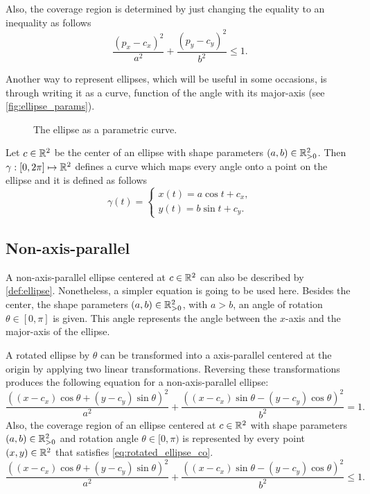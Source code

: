 Also, the coverage region is determined by just changing the equality to an inequality as follows
\begin{equation}\label{equation:cover_pellipse}
\frac{(p_x-c_x)^2}{a^2} + \frac{(p_y-c_y)^2}{b^2} \le 1.
\end{equation}

Another way to represent ellipses, which will be useful in some occasions, is through writing it as a curve, function of the angle with its major-axis (see \autoref{fig:ellipse_params}).

\begin{figure}[H]
    \centering
    
    \caption{The ellipse as a parametric curve.}
    
    \fautor
    \label{fig:ellipse_params}
\end{figure}

Let $c \in \mathbb{R}^2$ be the center of an ellipse with shape parameters $(a,b) \in \mathbb{R}^2_{>0}$. Then $\gamma : [0, 2\pi] \mapsto \mathbb{R}^2$ defines a curve which maps every angle onto a point on the ellipse and it is defined as follows
\begin{equation}\label{eq:parametric_ellipse}
\gamma(t) = \left\{
\begin{array}{l}
x(t)= a\cos{t} + c_x,\\
y(t)=b\sin{t} + c_y.
\end{array}
\right.
\end{equation}

\subsection{Non-axis-parallel}

A non-axis-parallel ellipse centered at $c\in\mathbb{R}^2$ can also be described by \autoref{def:ellipse}. Nonetheless, a simpler equation is going to be used here. Besides the center, the shape parameters $(a, b) \in \mathbb{R}^2_{>0}$, with $a > b$, an angle of rotation $\theta \in [0, \pi]$ is given. This angle represents the angle between the $x$-axis and the major-axis of the ellipse.

A rotated ellipse by $\theta$ can be transformed into a axis-parallel centered at the origin by applying two linear transformations. Reversing these transformations produces the following equation for a non-axis-parallel ellipse:
\begin{equation}\label{eq:rotated_ellipse}
\dfrac{((x-c_x)\cos\theta + (y-c_y)\sin\theta)^2}{a^2}+\dfrac{((x-c_x)\sin\theta - (y-c_y)\cos\theta)^2}{b^2}=1.
\end{equation}
Also, the coverage region of an ellipse centered at $c\in\mathbb{R}^2$ with shape parameters $(a, b)\in\mathbb{R}^2_{>0}$ and rotation angle $\theta \in [0, \pi)$ is represented by every point $(x, y) \in \mathbb{R}^2$ that satisfies \autoref{eq:rotated_ellipse_co}.
\begin{equation}\label{eq:rotated_ellipse_co}
\dfrac{((x-c_x)\cos\theta + (y-c_y)\sin\theta)^2}{a^2}+\dfrac{((x-c_x)\sin\theta - (y-c_y)\cos\theta)^2}{b^2}\le 1.
\end{equation}

